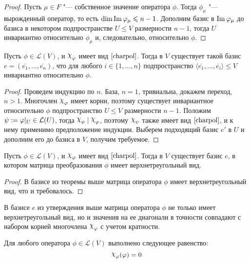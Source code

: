 \begin{proof}
	Пусть $\mu \in F$ "--- собственное значение оператора $\phi$. Тогда $\phi_\mu$ "--- вырожденный оператор, то есть $\dim{\operatorname{Im}{\ensuremath{\varphi}_\mu}} \leqslant n - 1$. Дополним базис в $\operatorname{Im}{\varphi_\mu}$ до базиса в некотором подпространстве $U \le V$ размерности $n - 1$, тогда $U$ инвариантно относительно $\phi_\mu$ и, следовательно, относительно $\phi$.
\end{proof}

\begin{theorem}
	Пусть $\phi \in \mathcal{L}(V)$, и $\Chi_\phi$ имеет вид $\eqref*{charpol}$. Тогда в $V$ существует такой базис $e = (\overline{e_1}, \dots, \overline{e_n})$, что для любого $i \in \{1, \dots, n\}$ подпространство $\langle\overline{e_1}, \dots, \overline{e_i}\rangle \le V$ инвариантно относительно $\phi$.
\end{theorem}

\begin{proof}
	Проведем индукцию по $n$. База, $n = 1$, тривиальна, докажем переход, $n > 1$. Многочлен $\Chi_\phi$ имеет корни, поэтому существует инвариантное относительно $\phi$ подпространство $U \le V$ размерности $n - 1$. Положим $\psi := \phi|_U \hm{\in} \mathcal{L}(U)$, тогда $\Chi_\psi\mid \Chi_\phi$, поэтому $\Chi_\psi$ также имеет вид $\eqref*{charpol}$, и к нему применимо предположение индукции. Выберем подходящий базис $e'$ в $U$ и дополним его до базиса в $V$, получим требуемое.
\end{proof}

\begin{corollary}
	Пусть $\phi \in \mathcal{L}(V)$, и $\Chi_\phi$ имеет вид $\eqref*{charpol}$. Тогда в $V$ существует базис $e$, в котором матрица преобразования $\phi$ имеет верхнетреугольный вид.
\end{corollary}

\begin{proof}
	В базисе из теоремы выше матрица оператора $\phi$ имеет верхнетреугольный вид, что и требовалось.
\end{proof}

\begin{note}
	В базисе $e$ из утверждения выше матрица оператора $\phi$ не только имеет верхнетреугольный вид, но и значения на ее диагонали в точности совпадают с набором корней многочлена $\Chi_\phi$ с учетом кратности.
\end{note}

\begin{theorem}
	Для любого оператора $\phi \in \mathcal{L}(V)$ выполнено следующее равенство:
	\[\Chi_\phi(\phi) = 0\]
\end{theorem}

